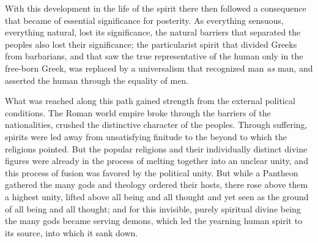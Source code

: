 \documentclass[12pt,a4paper,openany]{book}
\begin{document}
With this development in the life of the spirit there then followed a consequence
that became of essential significance for posterity. As
everything sensuous, everything natural, lost its significance, the natural barriers
that separated the peoples also lost their significance;
the particularist spirit that divided Greeks from barbarians, and
that saw the true representative of the human only in the free-born Greek,
was replaced by a universalism that recognized
man \emph{as} man, and asserted the human
through the equality of men.

What was reached along this path gained strength from the external
political conditions. The Roman world empire broke through
the barriers of the nationalities, crushed the distinctive character of the peoples.
Through suffering, spirits were led away from unsatisfying
finitude to the beyond to which the religions
pointed. But the popular religions and their individually distinct
divine figures were already in the process of melting
together into an unclear unity, and this process of fusion
was favored by the political unity. But while
a Pantheon gathered the many gods and theology ordered
their hosts, there rose above them a highest unity,
lifted above all being and all thought and yet seen as the ground of all
being and all thought; and for this invisible, purely
spiritual divine being the many gods became serving demons,
which led the yearning human spirit to its source, into which
it sank down.
\end{document}
